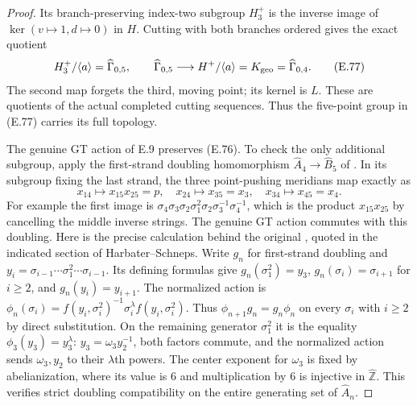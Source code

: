 \begin{proof}
Its branch-preserving index-two subgroup
$H_3^+$ is the inverse image of
$\ker(v\mapsto1,d\mapsto0)$ in $H$.
Cutting with both branches ordered gives
the exact quotient
\[
 H_3^+/\langle a\rangle=\widehat\Gamma_{0,5},
 \qquad
 \widehat\Gamma_{0,5}\longrightarrow
        H^+/\langle a\rangle
          =K_{\rm geo}=\widehat\Gamma_{0,4}.             \tag{E.77}
\]
The second map forgets the third, moving
point; its kernel is $L$.
These are quotients of the actual completed
cutting sequences.  Thus the five-point
group in (E.77) carries its full topology.

The genuine GT action of E.9 preserves
(E.76).  To check the only additional
subgroup, apply the first-strand doubling
homomorphism
$\widehat A_4\to\widehat B_5$ of
\cite[\S0.3, pp.~7--8]{ET_HS2000}.
In its subgroup fixing the last strand,
the three point-pushing meridians map exactly as
\[
 x_{14}\longmapsto x_{15}x_{25}=p,
 \quad x_{24}\longmapsto x_{35}=x_3,
 \quad x_{34}\longmapsto x_{45}=x_4.
\]
For example the first image is
$\sigma_4\sigma_3\sigma_2\sigma_1^2
\sigma_2\sigma_3^{-1}\sigma_4^{-1}$,
which is the product $x_{15}x_{25}$ by
cancelling the middle inverse strings.
The genuine GT action commutes
with this doubling.  Here is the precise
calculation behind the original
\cite[Proposition 10, preprint pp.~23--24]{ET_LS1994},
quoted in the indicated section of Harbater--Schneps.
Write $g_n$ for first-strand doubling and
$y_i=\sigma_{i-1}\cdots\sigma_1^2\cdots\sigma_{i-1}$.
Its defining formulas give
$g_n(\sigma_1^2)=y_3$,
$g_n(\sigma_i)=\sigma_{i+1}$ for $i\geq2$,
and $g_n(y_i)=y_{i+1}$.
The normalized action is
$\phi_n(\sigma_i)=f(y_i,\sigma_i^2)^{-1}
\sigma_i^\lambda f(y_i,\sigma_i^2)$.
Thus $\phi_{n+1}g_n=g_n\phi_n$ on every
$\sigma_i$ with $i\geq2$ by direct substitution.
On the remaining generator $\sigma_1^2$ it
is the equality $\phi_3(y_3)=y_3^\lambda$:
$y_3=\omega_3y_2^{-1}$, both factors commute,
and the normalized action sends
$\omega_3,y_2$ to their $\lambda$th powers.
The center exponent for $\omega_3$ is fixed by
abelianization, where its value is $6$ and
multiplication by $6$ is injective in
$\widehat{\mathbb Z}$.  This verifies strict
doubling compatibility on the entire generating
set of $\widehat A_n$.


\end{proof}
